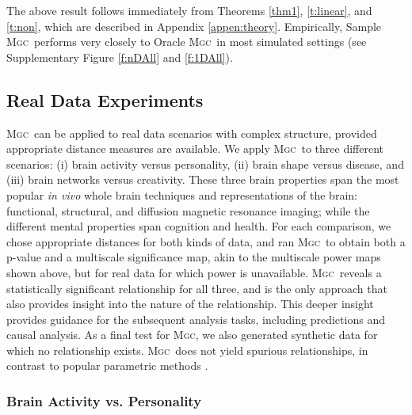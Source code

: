 \documentclass[11pt]{article}
\providecommand{\sct}[1]{{\normalfont\textsc{#1}}}
\newcommand{\Mgc}{\sct{Mgc}}
\begin{document}
The above result follows immediately from Theorems \ref{thm1}, \ref{t:linear}, and \ref{t:non}, which are described in Appendix \ref{appen:theory}. Empirically, Sample \Mgc~performs very closely to Oracle \Mgc~in most simulated settings (see Supplementary Figure \ref{f:nDAll} and \ref{f:1DAll}).


\subsection*{Real Data Experiments}
\label{numer3}

\Mgc~can be applied to  real data scenarios with complex structure, provided appropriate distance measures are available. We apply \Mgc~to three different scenarios: (i) brain activity versus personality, (ii) brain shape versus disease, and (iii) brain networks versus creativity.  These three brain properties span the most popular \emph{in vivo} whole brain techniques and representations of the brain: functional, structural, and diffusion magnetic resonance imaging; while the different mental properties span cognition and health.  For each comparison, we chose appropriate distances for both kinds of data, and ran \Mgc~to obtain both a p-value and a multiscale significance map, akin to the multiscale power maps shown above, but for real data for which power is unavailable. \Mgc~reveals a statistically significant relationship for all three, and is the only approach that also provides insight into the nature of the relationship. 
This deeper insight provides guidance for the subsequent analysis tasks, including predictions and causal analysis. As a final test for \Mgc, we also generated synthetic data for which no relationship exists. \Mgc~does not yield spurious relationships, in contrast to popular parametric methods \cite{EklundKnutsson2012,Eklund2015}. 


\subsubsection*{Brain Activity vs. Personality} 
\end{document}
